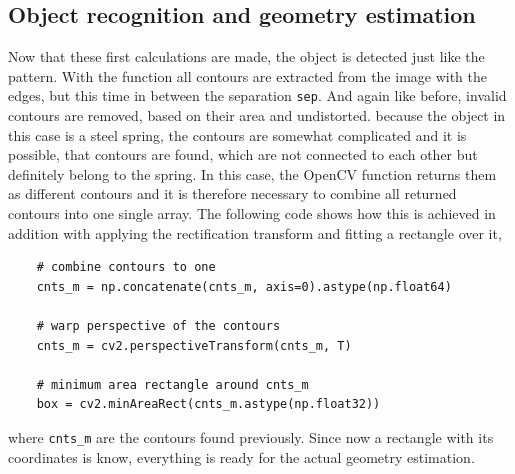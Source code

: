 \subsection{Object recognition and geometry estimation}
Now that these first calculations are made, the object is detected just like the pattern.
With the function  all contours are extracted from the image with the edges, but this time in between the separation \texttt{sep}.
And again like before, invalid contours are removed, based on their area and undistorted.
because the object in this case is a steel spring, the contours are somewhat complicated and it is possible, that contours are found, which are not connected to each other but definitely belong to the spring.
In this case, the OpenCV function returns them as different contours and it is therefore necessary to combine all returned contours into one single array.
The following code shows how this is achieved in addition with applying the rectification transform and fitting a rectangle over it,
\begin{lstlisting}
	# combine contours to one
	cnts_m = np.concatenate(cnts_m, axis=0).astype(np.float64)
	
	# warp perspective of the contours
	cnts_m = cv2.perspectiveTransform(cnts_m, T)
	
	# minimum area rectangle around cnts_m
	box = cv2.minAreaRect(cnts_m.astype(np.float32))
\end{lstlisting}
where \texttt{cnts\_m} are the contours found previously.
Since now a rectangle with its coordinates is know, everything is ready for the actual geometry estimation.

